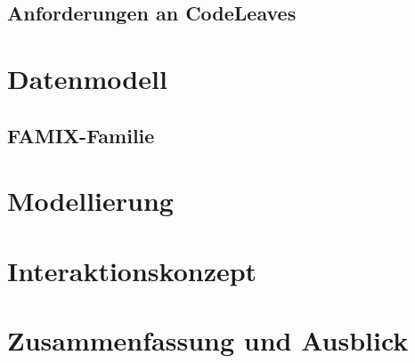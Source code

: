 \section{Anforderungen an CodeLeaves}
\label{sec:requirements}

\chapter{Datenmodell}
\label{ch:data-model}
\section{FAMIX-Familie}

\chapter{Modellierung}
\label{ch:modelling}

\chapter{Interaktionskonzept}
\label{ch:interaction}
\chapter{Zusammenfassung und Ausblick}
\label{ch:conclusion}
		